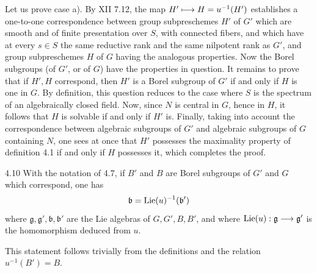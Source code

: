 Let us prove case a). By XII
7.12, the map $H'\longmapsto H=u^{-1}(H')$
establishes a one-to-one
correspondence between group
subpreschemes $H'$ of $G'$
which are smooth and of finite
presentation over $S$, with
connected fibers, and which
have at every $s\in S$ the
same reductive rank and the
same nilpotent rank as $G'$,
and group subpreschemes $H$
of $G$ having the analogous
properties. Now the Borel
subgroups (of $G'$, or of
$G$) have the properties in
question. It remains to
prove that if $H',H$
correspond, then $H'$ is
a Borel subgroup of $G'$
if and only if $H$ is
one in $G$. By definition,
this question reduces to
the case where $S$ is the
spectrum of an algebraically
closed field. Now, since
$N$ is central in $G$,
hence in $H$, it follows
that $H$ is solvable if
and only if $H'$ is.
Finally, taking into account
the correspondence between
algebraic subgroups of $G'$
and algebraic subgroups of
$G$ containing $N$, one sees
at once that $H'$ possesses
the maximality property of
definition 4.1 if and only
if $H$ possesses it, which
completes the proof.

\begin{corollary}{4.10}\label{XIV.4.10}
With the notation of 4.7,
if $B'$ and $B$ are Borel
subgroups of $G'$ and $G$
which correspond, one has
\[
 \mathfrak b=\operatorname{Lie}(u)^{-1}(\mathfrak b')
\]
where $\mathfrak g,\mathfrak g',\mathfrak b,\mathfrak b'$
are the Lie algebras of
$G,G',B,B'$, and where
$\operatorname{Lie}(u):\mathfrak g\longrightarrow\mathfrak g'$
is the homomorphism deduced
from $u$.
\end{corollary}
This statement follows
trivially from the definitions
and the relation $u^{-1}(B')=B$.

